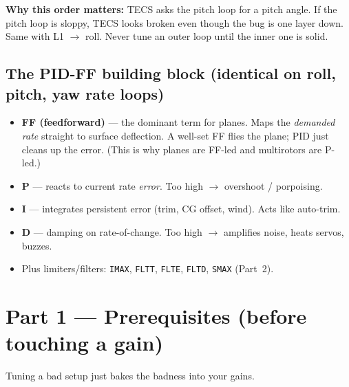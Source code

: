 \documentclass[11pt,a4paper]{article}
\newcommand{\pp}[1]{\texttt{#1}} %
\begin{document}
\textbf{Why this order matters:} TECS asks the pitch loop for a pitch angle. If
the pitch loop is sloppy, TECS looks broken even though the bug is one layer
down. Same with L1 $\rightarrow$ roll. Never tune an outer loop until the inner
one is solid.

\subsection*{The PID-FF building block (identical on roll, pitch, yaw rate loops)}
\begin{itemize}[leftmargin=1.4em]
  \item \textbf{FF (feedforward)} --- the dominant term for planes. Maps the
  \emph{demanded rate} straight to surface deflection. A well-set FF flies the
  plane; PID just cleans up the error. (This is why planes are FF-led and
  multirotors are P-led.)
  \item \textbf{P} --- reacts to current rate \emph{error}. Too high $\rightarrow$
  overshoot / porpoising.
  \item \textbf{I} --- integrates persistent error (trim, CG offset, wind). Acts
  like auto-trim.
  \item \textbf{D} --- damping on rate-of-change. Too high $\rightarrow$ amplifies
  noise, heats servos, buzzes.
  \item Plus limiters/filters: \pp{IMAX}, \pp{FLTT}, \pp{FLTE}, \pp{FLTD},
  \pp{SMAX} (Part~2).
\end{itemize}

\section{Part 1 --- Prerequisites (before touching a gain)}

Tuning a bad setup just bakes the badness into your gains.
\end{document}
